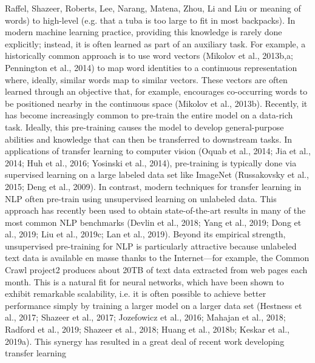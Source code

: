 Raffel, Shazeer, Roberts, Lee, Narang, Matena, Zhou, Li and Liu or meaning of words) to high-level (e.g. that a tuba is too large to fit in most backpacks). In modern machine learning practice, providing this knowledge is rarely done explicitly; instead, it is often learned as part of an auxiliary task. For example, a historically common approach is to use word vectors (Mikolov et al., 2013b,a; Pennington et al., 2014) to map word identities to a continuous representation where, ideally, similar words map to similar vectors. These vectors are often learned through an objective that, for example, encourages co-occurring words to be positioned nearby in the continuous space (Mikolov et al., 2013b). Recently, it has become increasingly common to pre-train the entire model on a data-rich task. Ideally, this pre-training causes the model to develop general-purpose abilities and knowledge that can then be transferred to downstream tasks. In applications of transfer learning to computer vision (Oquab et al., 2014; Jia et al., 2014; Huh et al., 2016; Yosinski et al., 2014), pre-training is typically done via supervised learning on a large labeled data set like ImageNet (Russakovsky et al., 2015; Deng et al., 2009). In contrast, modern techniques for transfer learning in NLP often pre-train using unsupervised learning on unlabeled data. This approach has recently been used to obtain state-of-the-art results in many of the most common NLP benchmarks (Devlin et al., 2018; Yang et al., 2019; Dong et al., 2019; Liu et al., 2019c; Lan et al., 2019). Beyond its empirical strength, unsupervised pre-training for NLP is particularly attractive because unlabeled text data is available en masse thanks to the Internet—for example, the Common Crawl project2 produces about 20TB of text data extracted from web pages each month. This is a natural fit for neural networks, which have been shown to exhibit remarkable scalability, i.e. it is often possible to achieve better performance simply by training a larger model on a larger data set (Hestness et al., 2017; Shazeer et al., 2017; Jozefowicz et al., 2016; Mahajan et al., 2018; Radford et al., 2019; Shazeer et al., 2018; Huang et al., 2018b; Keskar et al., 2019a). This synergy has resulted in a great deal of recent work developing transfer learning

\vspace{18pt}


